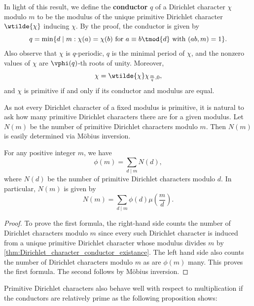 \documentclass[12pt]{article}
\begin{document}
      In light of this result, we define the \textbf{conductor} \(q\) of a Dirichlet character \(\chi\) modulo \(m\) to be the modulus of the unique primitive Dirichlet character \(\wtilde{\chi}\) inducing \(\chi\). By the proof, the conductor is given by
      \[
        q = \min\{d \mid m:\chi(a) = \chi(b) \text{ for } a \equiv b \tmod{d} \text{ with } (ab,m) = 1\}.
      \]
      Also observe that \(\chi\) is \(q\)-periodic, \(q\) is the minimal period of \(\chi\), and the nonzero values of \(\chi\) are \(\vphi(q)\)-th roots of unity. Moreover,
      \[
        \chi = \wtilde{\chi}\chi_{\frac{m}{q},0},
      \]
      and \(\chi\) is primitive if and only if its conductor and modulus are equal.
      
      As not every Dirichlet character of a fixed modulus is primitive, it is natural to ask how many primitive Dirichlet characters there are for a given modulus. Let \(N(m)\) be the number of primitive Dirichlet characters modulo \(m\). Then \(N(m)\) is easily determined via M\"obius inversion.

      \begin{proposition}
        For any positive integer \(m\), we have
        \[
          \phi(m) = \sum_{d \mid m}N(d),
        \]
        where \(N(d)\) be the number of primitive Dirichlet characters modulo \(d\). In particular, \(N(m)\) is given by
        \[
          N(m) = \sum_{d \mid m}\phi(d)\mu\left(\frac{m}{d}\right).
        \]
      \end{proposition}
      \begin{proof}
        To prove the first formula, the right-hand side counts the number of Dirichlet characters modulo \(m\) since every such Dirichlet character is induced from a unique primitive Dirichlet character whose modulus divides \(m\) by \cref{thm:Dirichlet_character_conductor_existance}. The left hand side also counts the number of Dirichlet characters modulo \(m\) as are \(\phi(m)\) many. This proves the first formula. The second follows by M\"obius inversion.
      \end{proof}

      Primitive Dirichlet characters also behave well with respect to multiplication if the conductors are relatively prime as the following proposition shows:
\end{document}
